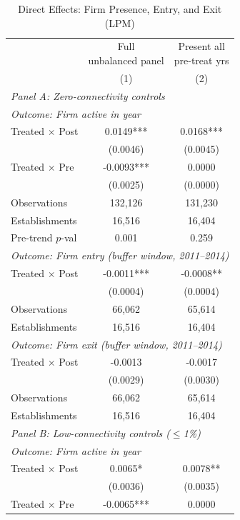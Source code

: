 \begin{table}[H]
\centering
\scriptsize
\caption{Direct Effects: Firm Presence, Entry, and Exit (LPM)}
\begin{tabular}{lcc}
\toprule
& \shortstack{Full\\unbalanced panel} & \shortstack{Present all\\pre-treat yrs} \\
& (1) & (2) \\
\midrule
\multicolumn{3}{l}{\textit{Panel A: Zero-connectivity controls}} \\
\midrule
\multicolumn{3}{l}{\textit{Outcome: Firm active in year}} \\
Treated $\times$ Post & 0.0149*** & 0.0168*** \\
& (0.0046) & (0.0045) \\[3pt]
Treated $\times$ Pre & -0.0093*** & 0.0000 \\
& (0.0025) & (0.0000) \\[3pt]
Observations   & 132,126 & 131,230 \\
Establishments & 16,516 & 16,404 \\
Pre-trend $p$-val & 0.001 & 0.259 \\
\midrule
\multicolumn{3}{l}{\textit{Outcome: Firm entry (buffer window, 2011--2014)}} \\
Treated $\times$ Post & -0.0011*** & -0.0008** \\
& (0.0004) & (0.0004) \\[3pt]
Observations   & 66,062 & 65,614 \\
Establishments & 16,516 & 16,404 \\
\midrule
\multicolumn{3}{l}{\textit{Outcome: Firm exit (buffer window, 2011--2014)}} \\
Treated $\times$ Post & -0.0013 & -0.0017 \\
& (0.0029) & (0.0030) \\[3pt]
Observations   & 66,062 & 65,614 \\
Establishments & 16,516 & 16,404 \\
\midrule
\multicolumn{3}{l}{\textit{Panel B: Low-connectivity controls ($\leq$1\%)}} \\
\midrule
\multicolumn{3}{l}{\textit{Outcome: Firm active in year}} \\
Treated $\times$ Post & 0.0065* & 0.0078** \\
& (0.0036) & (0.0035) \\[3pt]
Treated $\times$ Pre & -0.0065*** & 0.0000 \\

\end{tabular}
\end{table}
